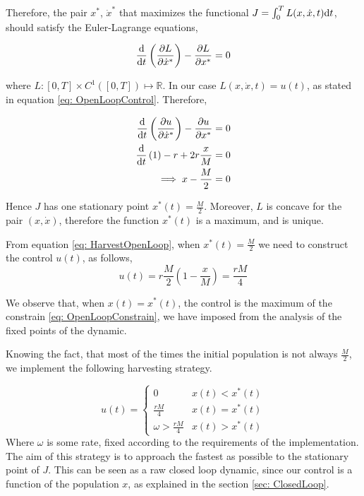 Therefore, the pair $x^*$, $\dot{x}^*$ that maximizes the functional $J=\int_0^T L(x, \dot{x}, t)\mathrm{d} t$, should satisfy the Euler-Lagrange equations,

\begin{equation}
	\frac{\mathrm{d} }{{\mathrm{d} t}}\left(\frac{\partial L}{{\partial \dot{x}^*}}\right)-\frac{\partial L}{{\partial x^*}}=0
\end{equation}

where $L:[0,T]\times C^1([0,T]) \mapsto \mathbb{R}$. In our case $L(x,\dot{x}, t)=u(t)$, as stated in equation \ref{eq: OpenLoopControl}. Therefore,

\begin{align}
	\frac{\mathrm{d} }{{\mathrm{d} t}}\left(\frac{\partial u}{{\partial \dot{x}^*}}\right)-\frac{\partial u}{{\partial x^*}}&=0 \nonumber\\ \frac{\mathrm{d} }{{\mathrm{d} t}}\left(1\right)-r+2r\frac{x}{M}&=0 \nonumber\\
	\implies x- \frac{M}{2}&=0
\end{align}

Hence $J$ has one stationary point $x^*(t)=\frac{M}{2}$. Moreover, $L$ is concave for the pair $(x, \dot{x})$, therefore the function $x^*(t)$ is a maximum, and is unique. 

From equation \ref{eq: HarvestOpenLoop}, when $x^*(t)=\frac{M}{2}$ we need to construct the control $u(t)$, as follows,
\begin{equation}
	u(t)=r\frac{M}{2}\left(1-\frac{x}{M}\right)=\frac{rM}{4}
\end{equation}

We observe that, when $x(t)=x^*(t)$, the control is the maximum of the constrain \ref{eq: OpenLoopConstrain}, we have imposed from the analysis of the fixed points of the dynamic. 

Knowing the fact, that most of the times the initial population is not always $\frac{M}{2}$, we implement the following harvesting strategy.

\begin{equation}
	u(t)=\begin{cases}
	0 & x(t)<x^*(t) \\
	\frac{rM}{4} & x(t)=x^*(t) \\
	\omega>\frac{rM}{4} & x(t)>x^*(t)
	\end{cases}
\end{equation}
Where $\omega$ is some rate, fixed according to the requirements of the implementation. The aim of this strategy is to approach the fastest as possible to the stationary point of $J$. This can be seen as a raw closed loop dynamic, since our control is a function of the population $x$, as explained in the section \ref{sec: ClosedLoop}.

